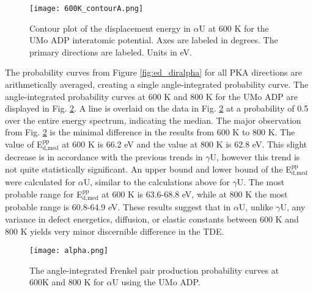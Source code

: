 \documentclass[review]{elsarticle}
\begin{document}
\begin{figure}[h]
 \centering
 \texttt{[image: 600K\_contourA.png]} 
 \caption{Contour plot of the displacement energy in $\alpha$U at 600 K for the UMo ADP interatomic potential. Axes are labeled in degrees. The primary directions are labeled. Units in eV.}
 \label{fig:600Kcontour}
\end{figure}

\FloatBarrier

The probability curves from Figure \ref{fig:ed_diralpha} for all PKA directions are arithmetically averaged, creating a single angle-integrated probability curve. The angle-integrated probability curves at 600 K and 800 K for the UMo ADP are displayed in Fig. \ref{fig:alpha}. A line is overlaid on the data in Fig. \ref{fig:alpha} at a probability of 0.5 over the entire energy spectrum, indicating the median. The major observation from Fig. \ref{fig:alpha} is the minimal difference in the results from 600 K to 800 K. The value of E$^{\textrm{pp}}_{\textrm{d,med}}$ at 600 K is 66.2 eV and the value at 800 K is 62.8 eV. This slight decrease is in accordance with the previous trends in $\gamma$U, however this trend is not quite statistically significant. An upper bound and lower bound of the E$^{\textrm{pp}}_{\textrm{d,med}}$ were calculated for $\alpha$U, similar to the calculations above for $\gamma$U. The most probable range for E$^{\textrm{pp}}_{\textrm{d,med}}$ at 600 K is 63.6-68.8 eV, while at 800 K the most probable range is 60.8-64.9 eV. These results suggest that in $\alpha$U, unlike $\gamma$U, any variance in defect energetics, diffusion, or elastic constants between 600 K and 800 K yields very minor discernible difference in the TDE.

\begin{figure}[h]
 \centering
 \texttt{[image: alpha.png]} 	
 \caption{The angle-integrated Frenkel pair production probability curves at 600K and 800 K for $\alpha$U using the UMo ADP.}
 \label{fig:alpha}
\end{figure}

\FloatBarrier
\end{document}

